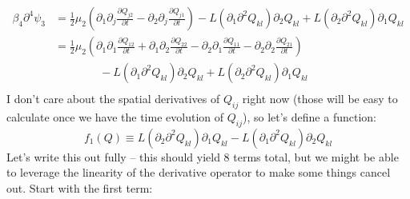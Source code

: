 \documentclass[reqno]{article}
\begin{document}
	\begin{equation}\label{eq:biharmexplcit}
	\begin{split}
		\beta_4\partial^4 \psi_3 &= \frac{1}{2}\mu_2 \left( \partial_1 \partial_j \frac{\partial Q_{j2}}{\partial t} - \partial_2\partial_j\frac{\partial Q_{j1}}{\partial t} \right) - L\left( \partial_1\partial^2 Q_{kl} \right)\partial_2 Q_{kl} + L\left( \partial_2 \partial^2 Q_{kl} \right) \partial_1 Q_{kl} \\
		&= \frac{1}{2}\mu_2 \left( \partial_1\partial_1 \frac{\partial Q_{12}}{\partial t} + \partial_1\partial_2 \frac{\partial Q_{22}}{\partial t} - \partial_2\partial_1 \frac{\partial Q_{11}}{\partial t} - \partial_2 \partial_2 \frac{\partial Q_{21}}{\partial t} \right)\\
		&\qquad\qquad -  L\left( \partial_1\partial^2 Q_{kl} \right)\partial_2 Q_{kl} + L\left( \partial_2 \partial^2 Q_{kl} \right) \partial_1 Q_{kl} \\
	\end{split}
	\end{equation}
	I don't care about the spatial derivatives of $Q_{ij}$ right now (those will be easy to calculate once we have the time evolution of $Q_{ij}$), so let's define a function:
	\begin{equation}
		f_1(Q) \equiv L\left( \partial_2 \partial^2 Q_{kl} \right) \partial_1 Q_{kl} - L\left( \partial_1\partial^2 Q_{kl} \right)\partial_2 Q_{kl}
	\end{equation}
	Let's write this out fully -- this should yield 8 terms total, but we might be able to leverage the linearity of the derivative operator to make some things cancel out. Start with the first term:
\end{document}
